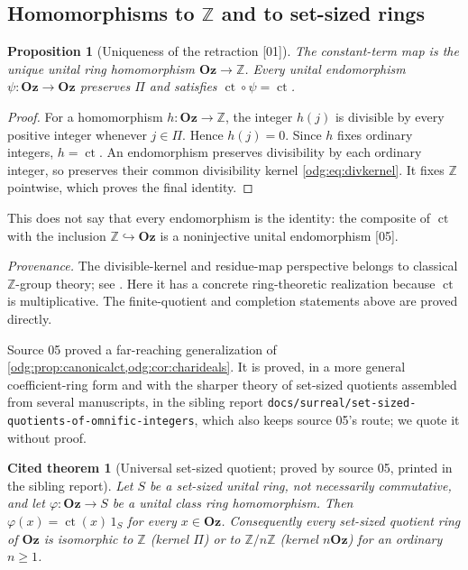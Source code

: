\documentclass[11pt,oneside]{article}
\numberwithin{equation}{section}
\newtheorem{proposition}[proposition]{Proposition}
\newtheorem{fact}[fact]{Cited theorem}
\theoremstyle{definition}
\theoremstyle{remark}
\newcommand{\Oz}{\mathbf{Oz}}
\newcommand{\Z}{\mathbb Z}
\newcommand{\ct}{\operatorname{ct}}
\newcommand{\src}[1]{\textup{\textsf{\small[#1]}}}
\newcommand{\status}[1]{\par\smallskip\noindent\textit{Provenance.} #1\par\smallskip}
\newcommand{\fn}[1]{\nolinkurl{#1}}
\begin{document}
\subsection{Homomorphisms to \texorpdfstring{$\Z$}{Z} and to set-sized rings}

\begin{proposition}[Uniqueness of the retraction \src{01}]\label{odg:prop:canonicalct}
The constant-term map is the unique unital ring homomorphism $\Oz\to\Z$.
Every unital endomorphism $\psi:\Oz\to\Oz$ preserves $\Pi$ and satisfies
$\ct\circ\psi=\ct$.
\end{proposition}
\begin{proof}
For a homomorphism $h:\Oz\to\Z$, the integer $h(j)$ is divisible by every
positive integer whenever $j\in\Pi$. Hence $h(j)=0$. Since $h$ fixes
ordinary integers, $h=\ct$. An endomorphism preserves divisibility by
each ordinary integer, so preserves their common divisibility kernel
\eqref{odg:eq:divkernel}. It fixes $\Z$ pointwise, which proves the final
identity.
\end{proof}

This does not say that every endomorphism is the identity: the composite of
$\ct$ with the inclusion $\Z\hookrightarrow\Oz$ is a noninjective unital
endomorphism \src{05}.

\status{The divisible-kernel and residue-map perspective belongs to
classical $\Z$-group theory; see \cite[Sections 2 and 4]{JerabekMLQ}.
Here it has a concrete ring-theoretic realization because $\ct$ is
multiplicative. The finite-quotient and completion statements above are
proved directly.}

Source 05 proved a far-reaching generalization of
\cref{odg:prop:canonicalct,odg:cor:charideals}. It is proved, in a more
general coefficient-ring form and with the sharper theory of set-sized
quotients assembled from several manuscripts, in the sibling report
\fn{docs/surreal/set-sized-quotients-of-omnific-integers}, which also keeps
source 05's route; we quote it without proof.

\begin{fact}[Universal set-sized quotient; proved by source 05, printed in the sibling report]\label{odg:fact:settarget}
Let $S$ be a set-sized unital ring, not necessarily commutative, and let
$\varphi:\Oz\to S$ be a unital class ring homomorphism. Then
$\varphi(x)=\ct(x)\,1_S$ for every $x\in\Oz$. Consequently every set-sized
quotient ring of $\Oz$ is isomorphic to $\Z$ (kernel $\Pi$) or to $\Z/n\Z$
(kernel $n\Oz$) for an ordinary $n\ge1$.
\end{fact}
\end{document}
